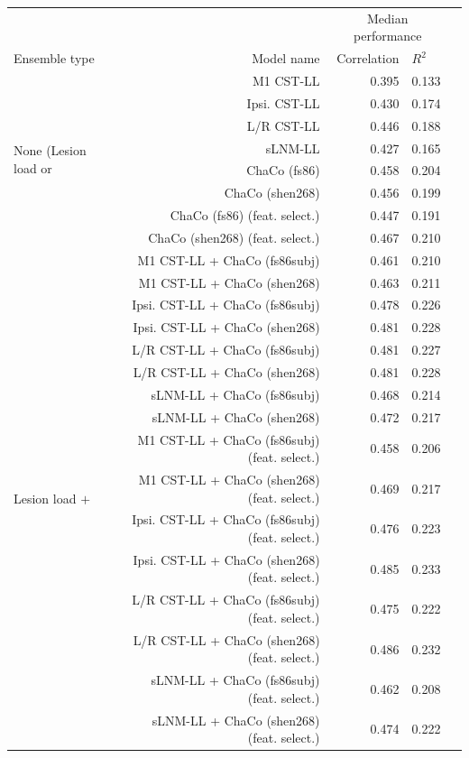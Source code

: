 \documentclass[10pt]{article}
\def\Plus{\texttt{+}}
\begin{document}
\begin{table}[h]
\centering
\label{table:5}
\begin{tabular}{lrrll}
\toprule
 &  & \multicolumn{2}{c}{Median performance} \\
Ensemble type & Model name & Correlation & $R^2$  \\
\midrule
\multirow[t]{8}{*}{None (Lesion load or} & M1 CST-LL & 0.395 & 0.133 \\
 ChaCo only)& Ipsi. CST-LL & 0.430 & 0.174 \\
 & L/R CST-LL & 0.446 & 0.188 \\
 & sLNM-LL & 0.427 & 0.165 \\
 & ChaCo (fs86) & 0.458 & 0.204 \\
 & ChaCo (shen268) & 0.456 & 0.199 \\
 & ChaCo (fs86) (feat. select.) & 0.447 & 0.191 \\
 & ChaCo (shen268) (feat. select.) & 0.467 & 0.210 \\
\multirow[t]{16}{*}{Lesion load $\Plus$} & M1 CST-LL + ChaCo (fs86subj) & 0.461 & 0.210 \\
 ChaCo & M1 CST-LL + ChaCo (shen268) & 0.463 & 0.211 \\
 & Ipsi. CST-LL + ChaCo (fs86subj) & 0.478 & 0.226 \\
 & Ipsi. CST-LL + ChaCo (shen268) & 0.481 & 0.228 \\
 & L/R CST-LL + ChaCo (fs86subj) & 0.481 & 0.227 \\
 & L/R CST-LL + ChaCo (shen268) & 0.481 & 0.228 \\
 & sLNM-LL + ChaCo (fs86subj) & 0.468 & 0.214 \\
 & sLNM-LL + ChaCo (shen268) & 0.472 & 0.217 \\
 & M1 CST-LL + ChaCo (fs86subj) (feat. select.) & 0.458 & 0.206 \\
 & M1 CST-LL + ChaCo (shen268) (feat. select.) & 0.469 & 0.217 \\
 & Ipsi. CST-LL + ChaCo (fs86subj) (feat. select.) & 0.476 & 0.223 \\
 & Ipsi. CST-LL + ChaCo (shen268) (feat. select.) & 0.485 & 0.233 \\
 & L/R CST-LL + ChaCo (fs86subj) (feat. select.) & 0.475 & 0.222 \\
 & L/R CST-LL + ChaCo (shen268) (feat. select.) & 0.486 & 0.232 \\
 & sLNM-LL + ChaCo (fs86subj) (feat. select.) & 0.462 & 0.208 \\
 & sLNM-LL + ChaCo (shen268) (feat. select.) & 0.474 & 0.222 \\

\end{tabular}
\end{table}
\end{document}
